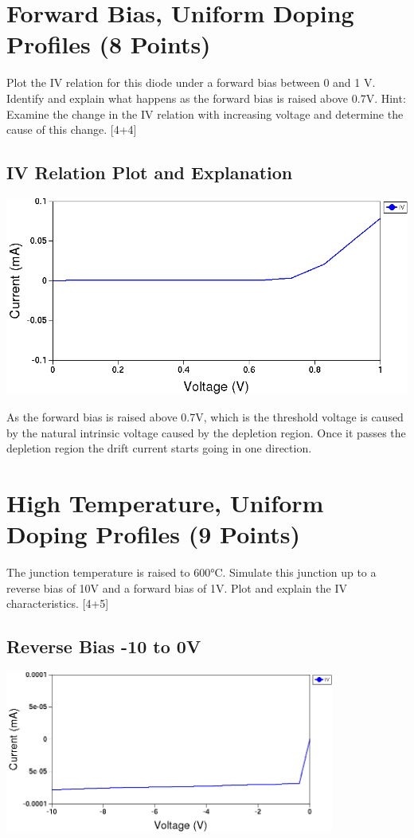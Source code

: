 \documentclass[12pt]{article}
\begin{document}
\section{Forward Bias, Uniform Doping Profiles (8 Points)}

Plot the IV relation for this diode under a forward bias between 0 and 1 V. Identify and explain what happens as the forward bias is raised above 0.7V.
Hint: Examine the change in the IV relation with increasing voltage and determine the cause of this change. [4+4]

\subsection{IV Relation Plot and Explanation}
\includegraphics[width=\textwidth]{3a.png}

As the forward bias is raised above 0.7V, which is the threshold voltage is caused by the natural intrinsic voltage caused by the depletion region. Once it passes the depletion region the drift current starts going in one direction. 

\section {High Temperature, Uniform Doping Profiles (9 Points)}
The junction temperature is raised to 600°C. Simulate this junction up to a reverse bias of 10V and a forward bias of 1V. Plot and explain the IV characteristics. [4+5]

\subsection{Reverse Bias -10 to 0V}
\includegraphics[width=\textwidth, height=200px]{4a.png}
\end{document}
